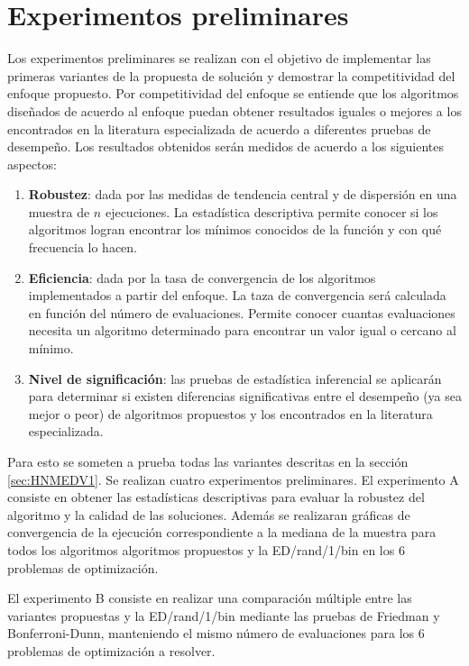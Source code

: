 \section{Experimentos preliminares}
Los experimentos preliminares se realizan con el objetivo de implementar las primeras variantes de la propuesta de solución y demostrar la competitividad del enfoque propuesto. Por competitividad del enfoque se entiende que los algoritmos diseñados de acuerdo al enfoque puedan obtener resultados iguales o mejores a los encontrados en la literatura especializada de acuerdo a diferentes pruebas de desempeño. Los resultados obtenidos serán medidos de acuerdo a los siguientes aspectos:
\begin{enumerate}
	\item \textbf{Robustez}: dada por las medidas de tendencia central y de dispersión en una muestra de $n$ ejecuciones. La estadística descriptiva permite conocer si los algoritmos logran encontrar los mínimos conocidos de la función y con qué frecuencia lo hacen. 
	\item \textbf{Eficiencia}: dada por la tasa de convergencia de los algoritmos implementados a partir del enfoque. La taza de convergencia será calculada en función del número de evaluaciones. Permite conocer cuantas evaluaciones necesita un algoritmo determinado para encontrar un valor igual o cercano al mínimo.
	\item \textbf{Nivel de significación}: las pruebas de estadística inferencial se aplicarán para determinar si existen diferencias significativas entre el desempeño (ya sea mejor o peor) de algoritmos propuestos y los encontrados en la literatura especializada.
\end{enumerate}

Para esto se someten a prueba todas las variantes descritas en la sección \ref{sec:HNMEDV1}. Se realizan cuatro experimentos preliminares. El experimento A  consiste en obtener las estadísticas descriptivas para evaluar la robustez del algoritmo y la calidad de las soluciones. Además se realizaran gráficas de convergencia de la ejecución correspondiente a la mediana de la muestra para todos los algoritmos algoritmos propuestos y la  ED/rand/1/bin en los 6 problemas de optimización.

El experimento B consiste en realizar una comparación múltiple entre las variantes propuestas y la ED/rand/1/bin mediante las pruebas de Friedman y Bonferroni-Dunn, manteniendo el mismo número de evaluaciones para los 6 problemas de optimización a resolver. 

